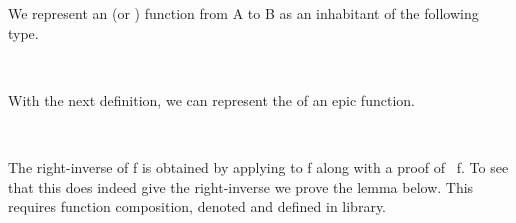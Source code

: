 We represent an  (or ) function from \ab A to \ab B \as as an inhabitant of the following type.
\ccpad
\begin{code}%
\>[1]\AgdaSpace{}%
\AgdaSymbol{:}\AgdaSpace{}%
\AgdaSymbol{(}\AgdaSpace{}%
\AgdaSpace{}%
\AgdaSymbol{)}\AgdaSpace{}%
%
\>[23]\AgdaSpace{}%
\AgdaSpace{}%
\AgdaSpace{}%
\<%
\\
%
\>[1]\AgdaSpace{}%
\AgdaSpace{}%
\AgdaSymbol{=}\AgdaSpace{}%
\AgdaSpace{}%
\AgdaSpace{}%
\AgdaSpace{}%
\AgdaSpace{}%
\AgdaSpace{}%
\AgdaSpace{}%
\<%
\end{code}
\ccpad
With the next definition, we can represent the  of an epic function.
\ccpad
\begin{code}%
\>[1]\AgdaSpace{}%
\AgdaSymbol{:}\AgdaSpace{}%
\AgdaSymbol{(}\AgdaSpace{}%
\AgdaSymbol{:}\AgdaSpace{}%
\AgdaSpace{}%
\AgdaSpace{}%
\AgdaSymbol{)}\AgdaSpace{}%
\AgdaSpace{}%
\AgdaSpace{}%
\AgdaSpace{}%
\AgdaSpace{}%
\AgdaSpace{}%
\AgdaSpace{}%
\<%
\\
%
\>[1]\AgdaSpace{}%
\AgdaSpace{}%
\AgdaSpace{}%
\AgdaSpace{}%
\AgdaSymbol{=}\AgdaSpace{}%
\AgdaSpace{}%
\AgdaSpace{}%
\AgdaSymbol{(}\AgdaSpace{}%
\AgdaSymbol{)}\<%
\end{code}
\ccpad
The right-inverse of \ab f is obtained by applying  to \ab f along with a proof of ~\ab f. To see that this does indeed give the right-inverse we prove the  lemma below. This requires function composition, denoted  and defined in \typtop library.
\ccpad
